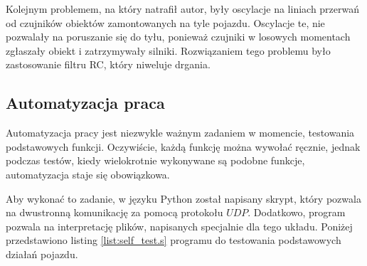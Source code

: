         Kolejnym problemem, na który natrafił autor, były oscylacje na liniach przerwań od czujników obiektów zamontowanych na tyle pojazdu.
        Oscylacje te, nie pozwalały na poruszanie się do tyłu, ponieważ czujniki w losowych momentach zgłaszały obiekt i zatrzymywały silniki.
        Rozwiązaniem tego problemu było zastosowanie filtru RC, który niweluje drgania.



    \subsection{Automatyzacja praca}
        Automatyzacja pracy jest niezwykle ważnym zadaniem w momencie, testowania podstawowych funkcji.
        Oczywiście, każdą funkcję można wywołać ręcznie, jednak podczas testów, kiedy wielokrotnie wykonywane są podobne funkcje, automatyzacja staje się obowiązkowa.

        Aby wykonać to zadanie, w języku Python został napisany skrypt, który pozwala na dwustronną komunikację za pomocą protokołu $UDP$.
        Dodatkowo, program pozwala na interpretację plików, napisanych specjalnie dla tego układu.
        Poniżej przedstawiono listing \ref{list:self_test.s} programu do testowania podstawowych działań pojazdu.

        
